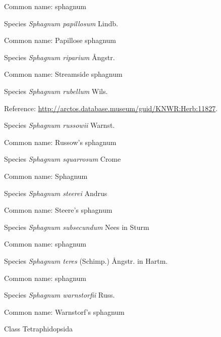 \documentclass[9pt, article]{memoir}
\begin{document}
\begin{multicols}{2}
Common name: sphagnum

\vspace{6pt}\noindent\hspace{36pt}Species \textit{Sphagnum papillosum} Lindb.


Common name: Papillose sphagnum

\vspace{6pt}\noindent\hspace{36pt}Species \textit{Sphagnum riparium} Ångstr.


Common name: Streamside sphagnum

\vspace{6pt}\noindent\hspace{36pt}Species \textit{Sphagnum rubellum} Wils.


Reference: 
\url{http://arctos.database.museum/guid/KNWR:Herb:11827}.

\vspace{6pt}\noindent\hspace{36pt}Species \textit{Sphagnum russowii} Warnst.


Common name: Russow's sphagnum

\vspace{6pt}\noindent\hspace{36pt}Species \textit{Sphagnum squarrosum} Crome


Common name: Sphagnum

\vspace{6pt}\noindent\hspace{36pt}Species \textit{Sphagnum steerei} Andrus


Common name: Steere's sphagnum

\vspace{6pt}\noindent\hspace{36pt}Species \textit{Sphagnum subsecundum} Nees in Sturm


Common name: sphagnum

\vspace{6pt}\noindent\hspace{36pt}Species \textit{Sphagnum teres} (Schimp.) Ångstr. in Hartm.


Common name: sphagnum

\vspace{6pt}\noindent\hspace{36pt}Species \textit{Sphagnum warnstorfii} Russ.


Common name: Warnstorf's sphagnum

\vspace{6pt}\noindent\hspace{12pt}Class Tetraphidopsida



\end{multicols}
\end{document}

